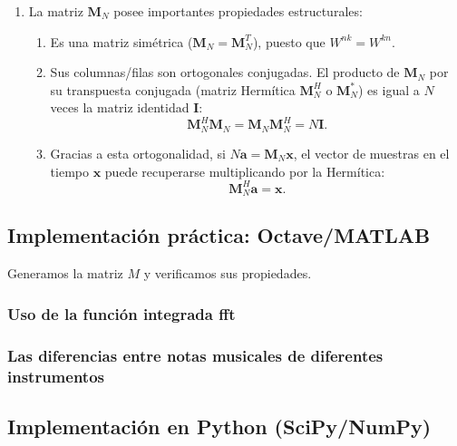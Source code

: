 \documentclass[11pt,a4paper,openany]{book}
\begin{document}
\begin{enumerate}
	\item La matriz $\mathbf{M}_N$ posee importantes propiedades estructurales:
	\begin{enumerate}
		\item Es una matriz simétrica ($\mathbf{M}_N = \mathbf{M}_N^T$), puesto que $W^{nk} = W^{kn}$.
		\item Sus columnas/filas son ortogonales conjugadas. El producto de $\mathbf{M}_N$ por su transpuesta conjugada (matriz Hermítica $\mathbf{M}_N^H$ o $\mathbf{M}_N^*$) es igual a $N$ veces la matriz identidad $\mathbf{I}$:
		\begin{equation}
			\mathbf{M}_{N}^H \mathbf{M}_{N} = \mathbf{M}_{N} \mathbf{M}_{N}^H = N \mathbf{I}.
		\end{equation}
		\item Gracias a esta ortogonalidad, si $N \mathbf{a} = \mathbf{M}_N \mathbf{x}$, el vector de muestras en el tiempo $\mathbf{x}$ puede recuperarse multiplicando por la Hermítica:
		\begin{equation}
			\mathbf{M}_{N}^H \mathbf{a} = \mathbf{x}.
		\end{equation}
	\end{enumerate}
\end{enumerate}

\subsection{Implementación práctica: Octave/MATLAB}

Generamos la matriz $M$ y verificamos sus propiedades.


\subsubsection{Uso de la función integrada fft}




\subsubsection{Las diferencias entre notas musicales de diferentes instrumentos}


\subsection{Implementación en Python (SciPy/NumPy)}
\end{document}
